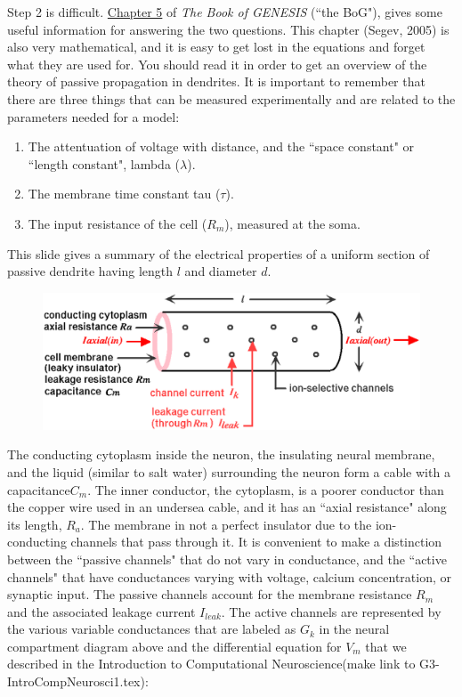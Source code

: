 \documentclass[12pt]{article}
\begin{document}
Step 2 is difficult. \href{../bog-ch5/bog-ch5.pdf}{Chapter 5} of {\it The Book of GENESIS} (``the BoG"), gives some useful information for answering the two questions. This chapter (Segev, 2005) is also very mathematical, and it is easy to get lost in the equations and forget what they are used for. You should read it in order to get an overview of the theory of passive propagation in dendrites. It is important to remember that there are three things that can be measured experimentally and are related to the parameters needed for a model:

\begin{enumerate}
\item The attentuation of voltage with distance, and the ``space constant" or ``length constant", lambda ($\lambda$).

\item The membrane time constant tau ($\tau$).

\item The input resistance of the cell ($R_m$), measured at the soma.
\end{enumerate}

This slide gives a summary of the electrical properties of a uniform section of passive dendrite having length $l$ and diameter $d$.

\begin{figure}[h]
  \centering
 \includegraphics[scale=0.4]{figs/dendrite_section2.eps}
  \label{fig:dendrite2}
\end{figure}

The conducting cytoplasm inside the neuron, the insulating neural membrane, and the liquid (similar to salt water) surrounding the neuron form a cable with a capacitance$ C_m$. The inner conductor, the cytoplasm, is a poorer conductor than the copper wire used in an undersea cable, and it has an ``axial resistance" along its length, $R_a$. The membrane in not a perfect insulator due to the ion-conducting channels that pass through it. It is convenient to make a distinction between the ``passive channels" that do not vary in conductance, and the ``active channels" that have conductances varying with voltage, calcium concentration, or synaptic input. The passive channels account for the membrane resistance $R_m$ and the associated leakage current $I_{leak}$. The active channels are represented by the various variable conductances that are labeled as $G_k$ in the neural compartment diagram above and the differential equation for $V_m$ that we described in the Introduction to Computational Neuroscience(make link to G3-IntroCompNeurosci1.tex):
\end{document}
